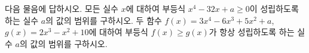 다음 물음에 답하시오.
 모든 실수 $x$에 대하여 부등식 $x^4-32x+a\ge 0$이 성립하도록 하는 실수 $a$의 값의 범위를 구하시오.
 두 함수 $f(x)=3x^4-6x^3+5x^2+a$, $g(x)=2x^3-x^2+10$에 대하여 부등식 $f(x)\ge g(x)$가 항상 성립하도록 하는 실수 $a$의 값의 범위를 구하시오.
